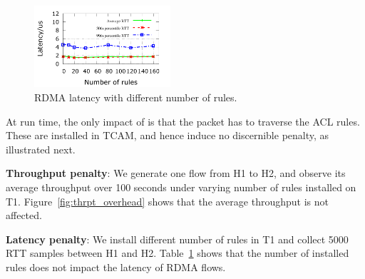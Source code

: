 \begin{figure}
	\centering
	\includegraphics[width=0.45\textwidth] {figs/RDMAlatency_overhead}
	\caption{RDMA latency with different number of rules.}\label{fig:latency_overhead}
\end{figure}

At run time, the only impact of \sysname{} is that the packet has
to traverse the ACL rules. These are installed in TCAM, and hence induce
no discernible penalty, as illustrated next.

\textbf{Throughput penalty}: We generate one flow from H1 to H2, and observe
its average throughput over 100 seconds under varying number of \sysname{} rules
installed on T1. Figure~\ref{fig:thrpt_overhead} shows that the average
throughput is not affected.

\textbf{Latency penalty}: We install different number of \sysname{} rules in T1
and collect 5000 RTT samples between H1 and H2.
Table~\ref{fig:latency_overhead} shows that the number of installed rules does
not impact the latency of RDMA flows.

